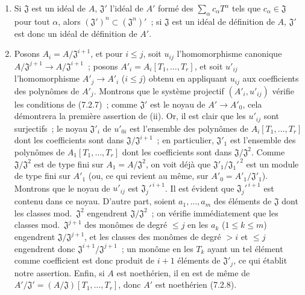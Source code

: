 \begin{enumerate}
  \item[(i)] Si $\mathfrak J$ est un idéal de $A$, $\mathfrak J'$ l'idéal de
  $A'$ formé des $\sum_\alpha c_\alpha T^\alpha$ tels que
  $c_\alpha\in\mathfrak J$ pour tout $\alpha$, alors
  $(\mathfrak J')^n\subset(\mathfrak J^n)'$~; si $\mathfrak J$ est un idéal de
  définition de $A$, $\mathfrak J'$ est donc un idéal de définition de $A'$.

  \item[(ii)] Posons $A_i=A/\mathfrak J^{i+1}$, et pour $i\leq j$, soit
  $u_{ij}$ l'homomorphisme canonique
  $A/\mathfrak J^{j+1}\to A/\mathfrak J^{i+1}$~; posons
  $A'_i=A_i[T_1,\ldots,T_r]$, et soit $u'_{ij}$ l'homomorphisme
  $A'_j\to A'_i$ ($i\leq j$) obtenu en appliquant $u_{ij}$ aux coefficients
  des polynômes de $A'_j$. Montrons que le système projectif
  $(A'_i,u'_{ij})$ vérifie les conditions de (7.2.7)~; comme $\mathfrak J'$ est
  le noyau de $A'\to A'_0$, cela démontrera la première assertion de (ii). Or,
  il est clair que les $u'_{ij}$ sont surjectifs~; le noyau $\mathfrak J'_i$
  de $u'_{0i}$ est l'ensemble des polynômes de
  $A_i[T_1,\ldots,T_r]$ dont les coefficients sont dans
  $\mathfrak J/\mathfrak J^{i+1}$~; en particulier, $\mathfrak J'_1$ est
  l'ensemble des polynômes de $A_1[T_1,\ldots,T_r]$ dont les coefficients
  sont dans $\mathfrak J/\mathfrak J^2$. Comme $\mathfrak J/\mathfrak J^2$
  est de type fini sur $A_1=A/\mathfrak J^2$, on voit déjà que
  $\mathfrak J'_1/\mathfrak J_1'^{\,2}$ est un module de type fini sur $A'_1$
  (ou, ce qui revient au même, sur
  $A'_0=A'_1/\mathfrak J'_1$). Montrons que le noyau de $u'_{ij}$ est
  $\mathfrak J_j'^{\,i+1}$. Il est évident que
  $\mathfrak J_j'^{\,i+1}$ est contenu dans ce noyau. D'autre part, soient
  $a_1,\ldots,a_m$ des éléments de $\mathfrak J$ dont les classes
  mod.~$\mathfrak J^2$ engendrent $\mathfrak J/\mathfrak J^2$~; on vérifie
  immédiatement que les classes mod.~$\mathfrak J^{j+1}$ des monômes de degré
  $\leq j$ en les $a_k$ ($1\leq k\leq m$) engendrent
  $\mathfrak J/\mathfrak J^{j+1}$, et les classes des monômes de degré $>i$
  et $\leq j$ engendrent donc
  $\mathfrak J^{i+1}/\mathfrak J^{j+1}$~; un monôme en les $T_k$ ayant un tel
  élément comme coefficient est donc produit de $i+1$ éléments de
  $\mathfrak J'_j$, ce qui établit notre assertion. Enfin, si $A$ est
  noethérien, il en est de même de
  $A'/\mathfrak J'=(A/\mathfrak J)[T_1,\ldots,T_r]$, donc $A'$ est noethérien
  (7.2.8).
\end{enumerate}

